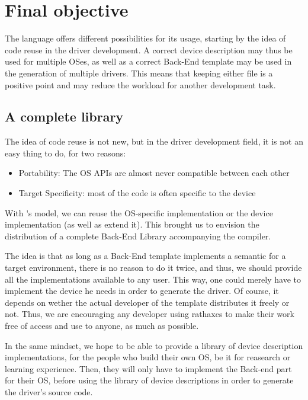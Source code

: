 \documentclass[american]{rtxreport}
\begin{document}
\section{Final objective}

The language offers different possibilities for its usage, starting by the idea
of code reuse in the driver development. A correct device description may thus
be used for multiple OSes, as well as a correct Back-End template may be used
in the generation of multiple drivers. This means that keeping either file is
a positive point and may reduce the workload for another development task.

\subsection{A complete library}

The idea of code reuse is not new, but in the driver development field,
it is not an easy thing to do, for two reasons:
\begin{itemize}
    \item Portability: The OS APIs are almost never compatible between
            each other
    \item Target Specificity: most of the code is often specific to the
            device
\end{itemize}

With \rtx\'{}s model, we can reuse the OS-specific implementation or the device
implementation (as well as extend it). This brought us to envision the
distribution of a complete Back-End Library accompanying the compiler.

The idea is that as long as a Back-End template implements a semantic for a
target environment, there is no reason to do it twice, and thus, we should
provide all the implementations available to any user. This way, one could
merely have to implement the device he needs in order to generate the driver.
Of course, it depends on wether the actual developer of the template
distributes it freely or not. Thus, we are encouraging any developer using
rathaxes to make their work free of access and use to anyone, as much as
possible.

In the same mindset, we hope to be able to provide a library of device
description implementations, for the people who build their own OS, be it
for reasearch or learning experience. Then, they will only have to implement
the Back-end part for their OS, before using the library of device
descriptions in order to generate the driver's source code.
\end{document}
